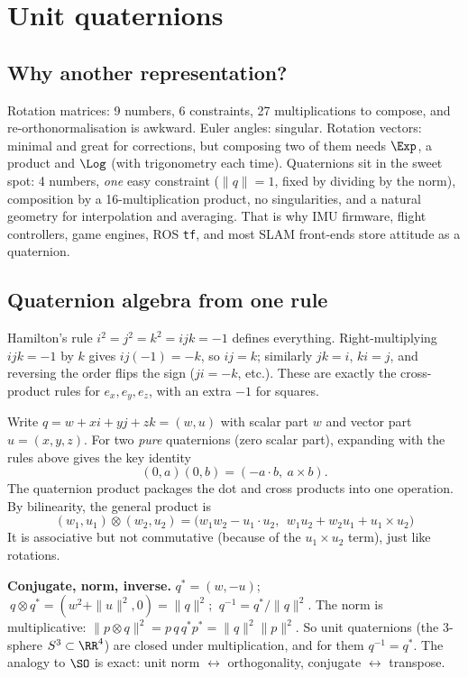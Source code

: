 \section{Unit quaternions}\label{sec:rot:quaternions}

\subsection{Why another representation?}\label{sec:rot:another-representation}
Rotation matrices: 9 numbers, 6 constraints, 27 multiplications to compose, and re-orthonormalisation is awkward. Euler angles: singular. Rotation vectors: minimal and great for corrections, but composing two of them needs $\Exp$, a product and $\Log$ (with trigonometry each time). Quaternions sit in the sweet spot: 4 numbers, \emph{one} easy constraint ($\|q\|=1$, fixed by dividing by the norm), composition by a 16-multiplication product, no singularities, and a natural geometry for interpolation and averaging. That is why IMU firmware, flight controllers, game engines, ROS \texttt{tf}, and most SLAM front-ends store attitude as a quaternion.

\subsection{Quaternion algebra from one rule}\label{sec:rot:quaternion-algebra-rule}
Hamilton's rule $i^2=j^2=k^2=ijk=-1$ defines everything. Right-multiplying $ijk=-1$ by $k$ gives $ij(-1)=-k$, so $ij=k$; similarly $jk=i$, $ki=j$, and reversing the order flips the sign ($ji=-k$, etc.). These are exactly the cross-product rules for $e_x,e_y,e_z$, with an extra $-1$ for squares.

Write $q=w+xi+yj+zk=(w,u)$ with scalar part $w$ and vector part $u=(x,y,z)$. For two \emph{pure} quaternions (zero scalar part), expanding with the rules above gives the key identity
\begin{equation}
(0,a)(0,b)=(-a\cdot b,\ a\times b).\label{eq:rot:purequat}
\end{equation}
The quaternion product packages the dot and cross products into one operation. By bilinearity, the general product is
\[
\boxed{(w_1,u_1)\otimes(w_2,u_2)=\big(w_1w_2-u_1\cdot u_2,\ \ w_1u_2+w_2u_1+u_1\times u_2\big)}
\]
It is associative but not commutative (because of the $u_1\times u_2$ term), just like rotations.

\textbf{Conjugate, norm, inverse.} $q^*=(w,-u)$; $\ q\otimes q^*=(w^2+\|u\|^2,0)=\|q\|^2$; $\ q^{-1}=q^*/\|q\|^2$. The norm is multiplicative: $\|p\otimes q\|^2=p\,q\,q^*p^*=\|q\|^2\|p\|^2$. So unit quaternions (the 3-sphere $S^3\subset\RR^4$) are closed under multiplication, and for them $q^{-1}=q^*$. The analogy to $\SO$ is exact: unit norm $\leftrightarrow$ orthogonality, conjugate $\leftrightarrow$ transpose.

